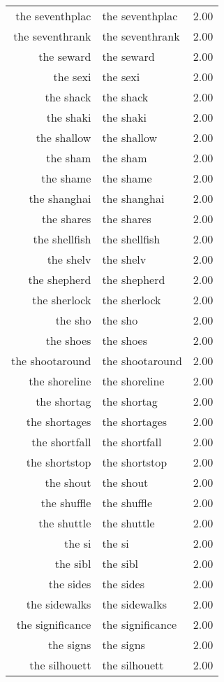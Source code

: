 \begin{table}[ht]
\begin{tabular}{rlr}
  the seventhplac & the seventhplac & 2.00 \\ 
  the seventhrank & the seventhrank & 2.00 \\ 
  the seward & the seward & 2.00 \\ 
  the sexi & the sexi & 2.00 \\ 
  the shack & the shack & 2.00 \\ 
  the shaki & the shaki & 2.00 \\ 
  the shallow & the shallow & 2.00 \\ 
  the sham & the sham & 2.00 \\ 
  the shame & the shame & 2.00 \\ 
  the shanghai & the shanghai & 2.00 \\ 
  the shares & the shares & 2.00 \\ 
  the shellfish & the shellfish & 2.00 \\ 
  the shelv & the shelv & 2.00 \\ 
  the shepherd & the shepherd & 2.00 \\ 
  the sherlock & the sherlock & 2.00 \\ 
  the sho & the sho & 2.00 \\ 
  the shoes & the shoes & 2.00 \\ 
  the shootaround & the shootaround & 2.00 \\ 
  the shoreline & the shoreline & 2.00 \\ 
  the shortag & the shortag & 2.00 \\ 
  the shortages & the shortages & 2.00 \\ 
  the shortfall & the shortfall & 2.00 \\ 
  the shortstop & the shortstop & 2.00 \\ 
  the shout & the shout & 2.00 \\ 
  the shuffle & the shuffle & 2.00 \\ 
  the shuttle & the shuttle & 2.00 \\ 
  the si & the si & 2.00 \\ 
  the sibl & the sibl & 2.00 \\ 
  the sides & the sides & 2.00 \\ 
  the sidewalks & the sidewalks & 2.00 \\ 
  the significance & the significance & 2.00 \\ 
  the signs & the signs & 2.00 \\ 
  the silhouett & the silhouett & 2.00 \\ 

\end{tabular}
\end{table}
